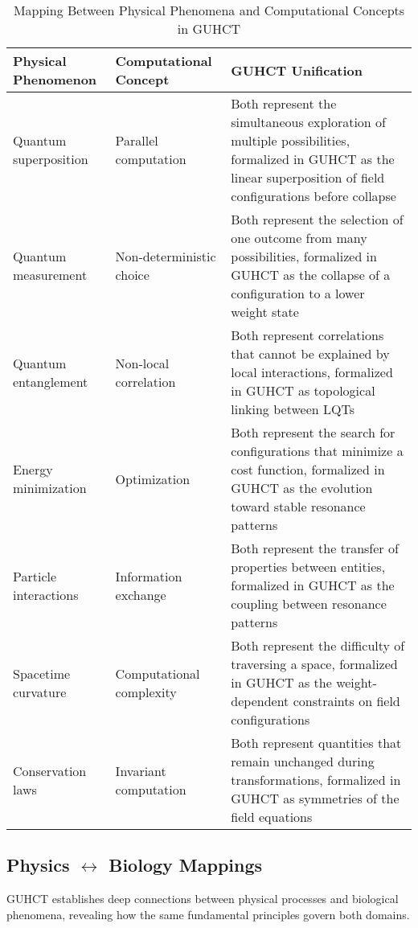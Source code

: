 \documentclass[11pt,a4paper]{article}
\begin{document}
\begin{table}[h!]
\centering
\caption{Mapping Between Physical Phenomena and Computational Concepts in GUHCT}
\label{tab:physics_computation_mapping}
\begin{tabular}{|p{3cm}|p{3cm}|p{8cm}|}
\hline
\textbf{Physical Phenomenon} & \textbf{Computational Concept} & \textbf{GUHCT Unification} \\
\hline
Quantum superposition & Parallel computation & Both represent the simultaneous exploration of multiple possibilities, formalized in GUHCT as the linear superposition of field configurations before collapse \\
\hline
Quantum measurement & Non-deterministic choice & Both represent the selection of one outcome from many possibilities, formalized in GUHCT as the collapse of a configuration to a lower weight state \\
\hline
Quantum entanglement & Non-local correlation & Both represent correlations that cannot be explained by local interactions, formalized in GUHCT as topological linking between LQTs \\
\hline
Energy minimization & Optimization & Both represent the search for configurations that minimize a cost function, formalized in GUHCT as the evolution toward stable resonance patterns \\
\hline
Particle interactions & Information exchange & Both represent the transfer of properties between entities, formalized in GUHCT as the coupling between resonance patterns \\
\hline
Spacetime curvature & Computational complexity & Both represent the difficulty of traversing a space, formalized in GUHCT as the weight-dependent constraints on field configurations \\
\hline
Conservation laws & Invariant computation & Both represent quantities that remain unchanged during transformations, formalized in GUHCT as symmetries of the field equations \\
\hline
\end{tabular}
\end{table}

\subsection{Physics \texorpdfstring{$\leftrightarrow$}{↔} Biology Mappings}
\label{subsec:physics_biology}


GUHCT establishes deep connections between physical processes and biological phenomena, revealing how the same fundamental principles govern both domains.
\end{document}
